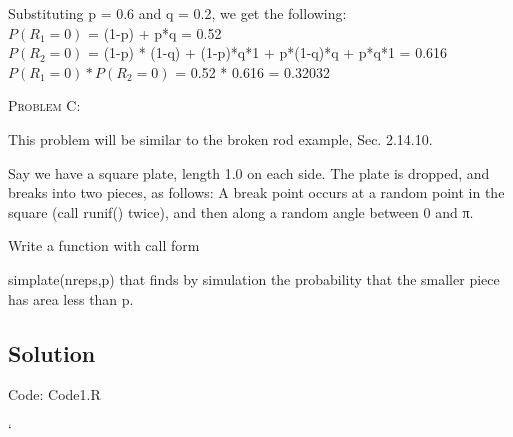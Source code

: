 \documentclass[12pt]{article}
\newenvironment{statement}[1]
{\begin{mdframed}[linewidth=0.6pt]
        \textsc{ #1:}

}
    {\end{mdframed}}
\begin{document}
Substituting p = 0.6 and q = 0.2, we get the following:\\
$P(R_1 = 0)$ = (1-p) + p*q = 0.52\\
$P(R_2 = 0)$ = (1-p) * (1-q) + (1-p)*q*1 + p*(1-q)*q + p*q*1 = 0.616\\
$P(R_1 = 0)*P(R_2 = 0)$ = 0.52 * 0.616 =  0.32032
\newpage
\begin{statement}{Problem C}
This problem will be similar to the broken rod example, Sec. 2.14.10.

Say we have a square plate, length 1.0 on each side. The plate is dropped, and breaks into two pieces, as follows: A break point occurs at a random point in the square (call runif() twice), and then along a random angle between 0 and π.

Write a function with call form

simplate(nreps,p)
that finds by simulation the probability that the smaller piece has area less than p.
\end{statement}
\subsection*{Solution}
Code: Code1.R




`
\end{document}

